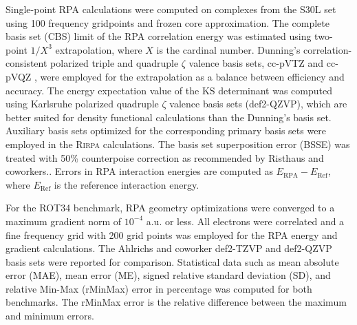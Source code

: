 \documentclass[twoside,twocolumn,9pt]{article}
\begin{document}
Single-point RPA calculations were computed on complexes from the S30L set
using 100 frequency gridpoints and frozen core approximation. The complete
basis set (CBS) limit of the RPA correlation energy was estimated using two-point
$1/X^3$ extrapolation, where $X$ is the cardinal number\cite{Eshuis12JChemPhys136p084105,
Halkier98ChemicalPhysicsLetters286p243}. Dunning's correlation-consistent
polarized triple and quadruple $\zeta$ valence basis sets, cc-pVTZ and
cc-pVQZ \cite{Dunning89JChemPhys90p1007}, were employed for the extrapolation as
a balance between efficiency and accuracy. The energy expectation value of the KS
determinant was computed using Karlsruhe polarized quadruple $\zeta$ valence basis
sets (def2-QZVP\cite{Weigend05PhysChemChemPhys7p3297}), which are better suited for
density functional calculations than the Dunning's basis set\cite{Weigend03JChemPhys119p12753}.
Auxiliary basis sets optimized for the corresponding primary basis sets were
employed in the \textsc{Rirpa} calculations\cite{Weigend02JChemPhys116p3175}. %
The basis set superposition error (BSSE) was treated with 50\% counterpoise
correction as recommended by Risthaus and coworkers.\cite{Risthaus13JChemTheoryComput9p1580,
Eshuis12JChemPhys136p084105}. Errors in RPA interaction energies are
computed as $E_{\text{RPA}}-E_{\text{Ref}}$, where $E_{\text{Ref}}$ is the reference
interaction energy.


For the ROT34 benchmark, RPA geometry optimizations were converged to a
maximum gradient norm of $10^{-4}$ a.u. or less. All electrons were
correlated and a fine frequency grid with 200 grid points was employed
for the RPA energy and gradient calculations. The Ahlrichs and coworker
def2-TZVP and def2-QZVP basis sets\cite{Weigend05PhysChemChemPhys7p3297}
were reported for comparison. Statistical data such as mean absolute error (MAE),
mean error (ME), signed relative standard deviation (SD), and relative
Min-Max (rMinMax) error in percentage was computed for both benchmarks.
The rMinMax error is the relative difference between the maximum and
minimum errors.

\end{document}
